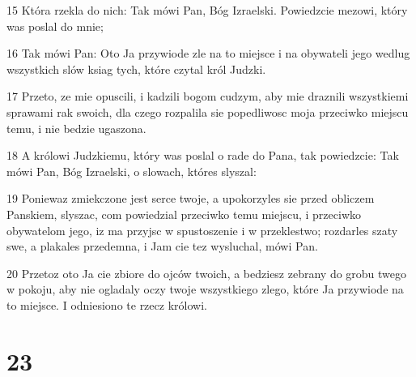 \par 15 Która rzekla do nich: Tak mówi Pan, Bóg Izraelski. Powiedzcie mezowi, który was poslal do mnie;
\par 16 Tak mówi Pan: Oto Ja przywiode zle na to miejsce i na obywateli jego wedlug wszystkich slów ksiag tych, które czytal król Judzki.
\par 17 Przeto, ze mie opuscili, i kadzili bogom cudzym, aby mie draznili wszystkiemi sprawami rak swoich, dla czego rozpalila sie popedliwosc moja przeciwko miejscu temu, i nie bedzie ugaszona.
\par 18 A królowi Judzkiemu, który was poslal o rade do Pana, tak powiedzcie: Tak mówi Pan, Bóg Izraelski, o slowach, któres slyszal:
\par 19 Poniewaz zmiekczone jest serce twoje, a upokorzyles sie przed obliczem Panskiem, slyszac, com powiedzial przeciwko temu miejscu, i przeciwko obywatelom jego, iz ma przyjsc w spustoszenie i w przeklestwo; rozdarles szaty swe, a plakales przedemna, i Jam cie tez wysluchal, mówi Pan.
\par 20 Przetoz oto Ja cie zbiore do ojców twoich, a bedziesz zebrany do grobu twego w pokoju, aby nie ogladaly oczy twoje wszystkiego zlego, które Ja przywiode na to miejsce. I odniesiono te rzecz królowi.

\chapter{23}


